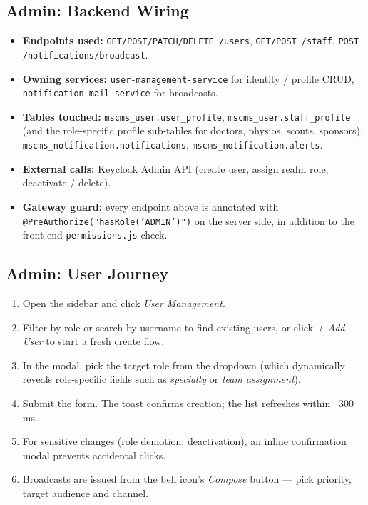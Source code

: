 \documentclass[12pt,a4paper,oneside]{report}
\begin{document}
\subsection*{Admin: Backend Wiring}
\begin{itemize}[leftmargin=*]
  \item \textbf{Endpoints used:} \texttt{GET/POST/PATCH/DELETE
        /users}, \texttt{GET/POST /staff},
        \texttt{POST /notifications/broadcast}.
  \item \textbf{Owning services:} \texttt{user-management-service}
        for identity / profile CRUD,
        \texttt{notification-mail-service} for broadcasts.
  \item \textbf{Tables touched:} \texttt{mscms\_user.user\_profile},
        \texttt{mscms\_user.staff\_profile} (and the role-specific
        profile sub-tables for doctors, physios, scouts, sponsors),
        \texttt{mscms\_notification.notifications},
        \texttt{mscms\_notification.alerts}.
  \item \textbf{External calls:} Keycloak Admin API (create user,
        assign realm role, deactivate / delete).
  \item \textbf{Gateway guard:} every endpoint above is annotated
        with \texttt{@PreAuthorize("hasRole('ADMIN')")} on the
        server side, in addition to the front-end
        \texttt{permissions.js} check.
\end{itemize}

\subsection*{Admin: User Journey}
\begin{enumerate}[leftmargin=*]
  \item Open the sidebar and click \emph{User Management}.
  \item Filter by role or search by username to find existing users,
        or click \emph{+ Add User} to start a fresh create flow.
  \item In the modal, pick the target role from the dropdown (which
        dynamically reveals role-specific fields such as
        \emph{specialty} or \emph{team assignment}).
  \item Submit the form. The toast confirms creation; the list
        refreshes within ~300\,ms.
  \item For sensitive changes (role demotion, deactivation), an
        inline confirmation modal prevents accidental clicks.
  \item Broadcasts are issued from the bell icon's \emph{Compose}
        button --- pick priority, target audience and channel.
\end{enumerate}
\end{document}
